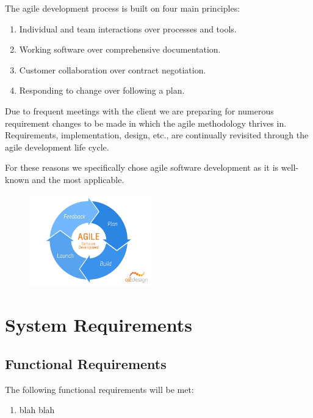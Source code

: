 \documentclass{article}
\begin{document}
	\begin{flushleft}
	The agile development process is built on four main principles:
		\begin{enumerate}
			\item Individual and team interactions over processes and tools.
			\item Working software over comprehensive documentation.
			\item Customer collaboration over contract negotiation.
			\item Responding to change over following a plan.		
		\end{enumerate}	
	\end{flushleft}	
	
\begin{flushleft}		
Due to frequent meetings with the client we are preparing for numerous requirement changes to be made in which the agile methodology thrives in. Requirements, implementation, design, etc., are continually revisited through the agile development life cycle.

\bigskip

For these reasons we specifically chose agile software development as it is well-known and the most applicable.
\end{flushleft}

	\begin{figure}[H]
			\centering
			\includegraphics[width=200px,height=150px]{agile.JPG}
	\end{figure}
	
\section{System Requirements}

	\subsection{Functional Requirements}
	
	The following functional requirements will be met:
	
	\begin{enumerate}
			\item blah blah
	\end{enumerate}
	
\end{document}
